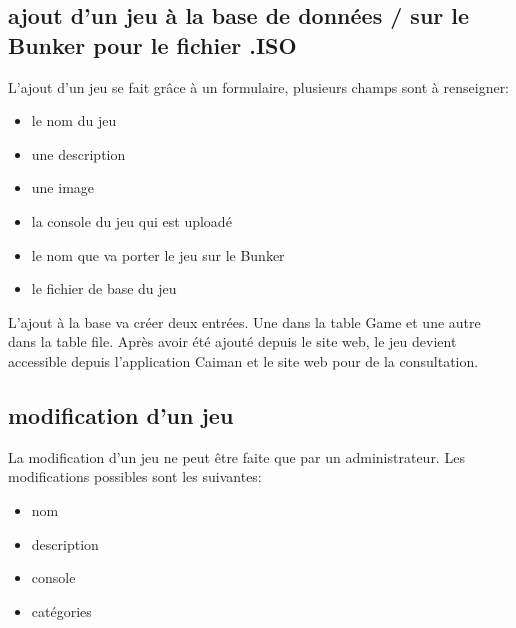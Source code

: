 \documentclass[a4paper,12pt,french]{sphinxmanual}
\begin{document}
\sphinxAtStartPar
{}

\sphinxAtStartPar
{}


\subsection{ajout d’un jeu à la base de données / sur le Bunker pour le fichier .ISO}
\label{\detokenize{fonctionnelle:ajout-dun-jeu-a-la-base-de-donnees-sur-le-bunker-pour-le-fichier-iso}}
\sphinxAtStartPar
L’ajout d’un jeu se fait grâce à un formulaire, plusieurs champs sont à renseigner:
\begin{itemize}
\item {} 
\sphinxAtStartPar
le nom du jeu

\item {} 
\sphinxAtStartPar
une description

\item {} 
\sphinxAtStartPar
une image

\item {} 
\sphinxAtStartPar
la console du jeu qui est uploadé

\item {} 
\sphinxAtStartPar
le nom que va porter le jeu sur le Bunker

\item {} 
\sphinxAtStartPar
le fichier de base du jeu

\end{itemize}

\sphinxAtStartPar
L’ajout à la base va créer deux entrées. Une dans la table Game et une autre dans la table file. Après avoir été ajouté depuis le site web, le jeu devient accessible depuis l’application Caiman et le site web pour de la consultation.

\sphinxAtStartPar
{}


\subsection{modification d’un jeu}
\label{\detokenize{fonctionnelle:modification-dun-jeu}}
\sphinxAtStartPar
La modification d’un jeu ne peut être faite que par un administrateur. Les modifications possibles sont les suivantes:
\begin{itemize}
\item {} 
\sphinxAtStartPar
nom

\item {} 
\sphinxAtStartPar
description

\item {} 
\sphinxAtStartPar
console

\item {} 
\sphinxAtStartPar
catégories

\end{itemize}
\end{document}
